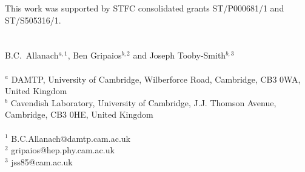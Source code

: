 \documentclass[prl,reprint,amsmath,amssymb,notitlepage]{revtex4-1}
\begin{document}
This work was supported by STFC consolidated grants ST/P000681/1 and ST/S505316/1. 
\\
\\
\\
B.C.\ Allanach$^{a,1}$, Ben Gripaios$^{b,2}$ and Joseph Tooby-Smith$^{b,3}$\\
\\
$^{a}$ DAMTP, University of Cambridge, Wilberforce Road, Cambridge, 
CB3 0WA, United Kingdom\\
$^{b}$ Cavendish Laboratory, University of Cambridge, J.J. Thomson
  Avenue, Cambridge, CB3 0HE, United Kingdom \\
\\
$^{1}$ B.C.Allanach@damtp.cam.ac.uk\\
$^{2}$ gripaios@hep.phy.cam.ac.uk\\
$^{3}$ jss85@cam.ac.uk
\end{document}

